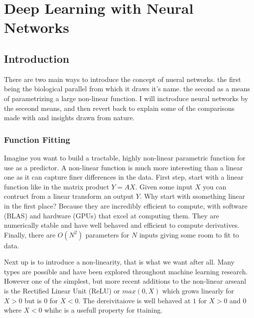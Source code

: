 
\chapter{Deep Learning with Neural Networks} %

\label{Chapter3} %






	\section{Introduction}
    
    
    
    
    
There are two main ways to introduce the concept of nueral networks.
the first being the biological parallel from which it draws it's name.
the second as a means of parametrizing a large non-linear function.
I will inctroduce neural networks by the seceond means, and then revert back to explain some of the comparisons made with and insights drawn from nature.
    	\subsection{Function Fitting}
Imagine you want to build a tractable, highly non-linear parametric function for use as a predictor.
A non-linear function is much more interesting than a linear one as it can capture finer differences in the data.
First step, start with a linear function like in the matrix product $Y = AX$.
Given some input $X$ you can contruct from a linear transform an output $Y$.
Why start with ssomething linear in the first place?
Because they are incredibly efficient to compute, with software (BLAS) and hardware (GPUs) that excel at computing them.
They are numerically stable and have well behaved and efficient to compute derivatives.
Finally, there are $O(N^2)$ parameters for $N$ inputs giving some room to fit to data.

Next up is to introduce a non-linearity, that is what we want after all.
Many types are possible and have been explored throughout machine learning research.
However one of the simplest, but more recent additions to the non-linear arseanl is the Rectified Linear Unit (ReLU) or $max(0,X)$ which grows linearly for $X>0$ but is $0$ for $X<0$.
The dereivitaiove is well behaved at $1$ for $X>0$ and $0$ where $X<0$ whihc is a usefull property for ttaining.


